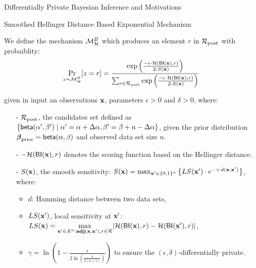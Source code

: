 \documentclass[final,hyperref={pdfpagelabels=false}]{beamer}
\begin{document}
\begin{frame}[t]
\begin{columns}[t]
\begin{column}{.485\textwidth}
\begin{block}{Differentially Private Bayesian Inference and Motivations}
\end{block}



\begin{block}{Smoothed Hellinger Distance Based Exponential Mechanism}

We define the mechanism $\mathcal{M}^{B}_{\mathcal{H}}$ which produces an element $r$ in $\mathcal{R}_{\textup{post}}$ with probaiblity:
\[
\underset{z \thicksim \mathcal{M}^{B}_{\mathcal{H}}}{\Pr}[z=r] = 
\frac 
{\exp \Big(\frac{-\epsilon\cdot\mathcal{H}(\mathsf{BI}(\textbf{x}),r)}{2\cdot S(\textbf{x})}\Big)}
{\sum_{r\in\mathcal{R}_{\textup{post}}} \exp \Big(\frac{-\epsilon\cdot\mathcal{H}(\mathsf{BI}(\textbf{x}),r)}{2\cdot S(\textbf{x})}\Big)}
\]

given in input an observations $\textbf{x}$, parameters $\epsilon>0$ and $\delta>0$, where:

\begin{itemize}
  \item[-] $\mathcal{R}_{\textup{post}}$, the candidates set defined as $\{\mathsf{beta}(\alpha',\beta')\mid \alpha'=\alpha+\Delta\alpha, \beta'=\beta+n-\Delta\alpha\}$, given the prior distribution $\boldsymbol{\beta}_{\textup{prior}}=\mathsf{beta}(\alpha, \beta)$ and observed data set size $n$.

  \item[-] $-\mathcal{H}(\mathsf{BI}(\textbf{x}),r)$ denotes the scoring function based on the Hellinger distance.

  \item[-] $S(\textbf{x})$, the smooth sensitivity\cite{nissim2007smooth}:
  $
  S(\textbf{x})=\max_{\textbf{x}' \in \{0,1\}^{n}}\big\{ LS(\textbf{x}') \cdot e^{-\gamma\cdot d(\textbf{x},\textbf{x}')}\big\}
  $,
  where:
  \begin{itemize}
   \item $d$: Hamming distance between two data sets,

   \item $LS(\textbf{x}')$, local sensitivity at $\textbf{x}'$:
   $
   LS(\textbf{x})=\max\limits_{\textbf{x}' \in \mathcal{X}^n:\textbf{adj}(\textbf{x},\textbf{x}'), r\in \mathcal{R}}\lvert \mathcal{H}(\mathsf{BI}(\textbf{x}), r) - \mathcal{H}(\mathsf{BI}(\textbf{x}'), r)\rvert
   $,

   \item $\gamma =   \ln(1 - \frac{\epsilon}{2 \ln (\frac{\delta}{2 (n + 1)})})$ to ensure the $(\epsilon,\delta)$-differentially private.
 \end{itemize}
\end{itemize}



\end{block}
\end{column}
\end{columns}
\end{frame}
\end{document}
